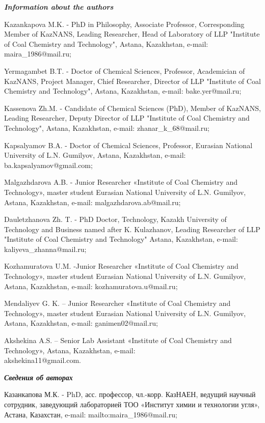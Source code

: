 \begin{info}
\emph{{\bfseries Information about the authors}}

Kazankapova M.K. - PhD in Philosophy, Associate Professor, Corresponding
Member of KazNANS, Leading Researcher, Head of Laboratory of LLP
"Institute of Coal Chemistry and Technology", Astana, Kazakhstan,
e-mail: maira\_1986@mail.ru;

Yermagambet B.T. - Doctor of Chemical Sciences, Professor, Academician
of KazNANS, Project Manager, Chief Researcher, Director of LLP
"Institute of Coal Chemistry and Technology", Astana, Kazakhstan,
e-mail: bake.yer@mail.ru;

Kassenova Zh.M. - Candidate of Chemical Sciences (PhD), Member of
KazNANS, Leading Researcher, Deputy Director of LLP "Institute of Coal
Chemistry and Technology", Astana, Kazakhstan, e-mail:
zhanar\_k\_68@mail.ru;

Kapsalyamov B.A. - Doctor of Chemical Sciences, Professor, Eurasian
National University of L.N. Gumilyov, Astana, Kazakh\-stan, e-mail:
ba.kapsalyamov@gmail.com;

Malgazhdarova A.B. - Junior Researcher «Institute of Coal Chemistry and
Technology», master student Eurasian National University of L.N.
Gumilyov, Astana, Kazakhstan, e-mail: malgazhdarova.ab@mail.ru;

Dauletzhanova Zh. T. - PhD Doctor, Technology, Kazakh University of
Technology and Business named after K. Kulazhanov, Leading Researcher of
LLP "Institute of Coal Chemistry and Technology" Astana, Kazakhstan,
e-mail: \\kaliyeva\_zhanna@mail.ru;

Kozhamuratova U.M. -Junior Researcher «Institute of Coal Chemistry and
Technology», master student Eurasian National University of L.N.
Gumilyov, Astana, Kazakhstan, e-mail: kozhamuratova.u@mail.ru;

Mendaliyev G. K. -- Junior Researcher «Institute of Coal Chemistry and
Technology», master student Eurasian National University of L.N.
Gumilyov, Astana, Kazakhstan, e-mail: ganimen02@mail.ru;

Akshekina A.S. -- Senior Lab Assistant «Institute of Coal Chemistry and
Technology», Astana, Kazakhstan, e-mail: \\akshekina11@gmail.com.

\emph{{\bfseries Сведения об авторах}}

Казанкапова М.К. - PhD, асс. профессор, чл.-корр. КазНАЕН, ведущий
научный сотрудник, заведующий лабораторией ТОО «Институт химии и
технологии угля», Астана, Казахстан, e-mail:
mailto:maira\_1986@mail.ru;


\end{info}
